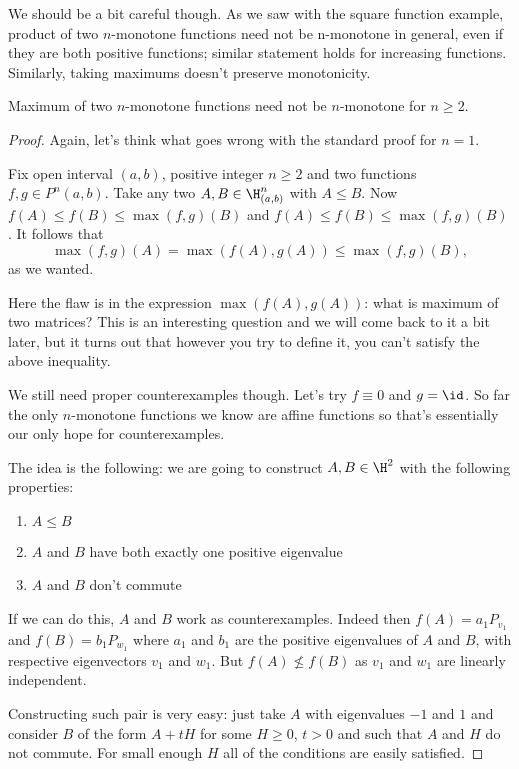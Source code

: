 We should be a bit careful though. As we saw with the square function example, product of two $n$-monotone functions need not be n-monotone in general, even if they are both positive functions; similar statement holds for increasing functions. Similarly, taking maximums doesn't preserve monotonicity.

\begin{prop}
	Maximum of two $n$-monotone functions need not be $n$-monotone for $n \geq 2$.
\end{prop}
\begin{proof}
	Again, let's think what goes wrong with the standard proof for $n = 1$.

	Fix open interval $(a, b)$, positive integer $n \geq 2$ and two functions $f, g \in P^{n}(a, b)$. Take any two $A, B \in \H_{(a, b)}^{n}$ with $A \leq B$. Now $f(A) \leq f(B) \leq \max(f, g)(B)$ and $f(A) \leq f(B) \leq \max(f, g)(B)$. It follows that
	\[
		\max(f, g)(A) = \max(f(A), g(A)) \leq \max(f, g)(B),
	\]
	as we wanted.

	Here the flaw is in the expression $\max(f(A), g(A))$: what is maximum of two matrices? This is an interesting question and we will come back to it a bit later, but it turns out that however you try to define it, you can't satisfy the above inequality.

	We still need proper counterexamples though. Let's try $f \equiv 0$ and $g = \id$. So far the only $n$-monotone functions we know are affine functions so that's essentially our only hope for counterexamples.

	The idea is the following: we are going to construct $A, B \in \H^{2}$ with the following properties:
	\begin{enumerate}
		\item $A \leq B$
		\item $A$ and $B$ have both exactly one positive eigenvalue
		\item $A$ and $B$ don't commute
	\end{enumerate}
	If we can do this, $A$ and $B$ work as counterexamples. Indeed then $f(A) = a_{1} P_{v_{1}}$ and $f(B) = b_{1} P_{w_{1}}$ where $a_{1}$ and $b_{1}$ are the positive eigenvalues of $A$ and $B$, with respective eigenvectors $v_{1}$ and $w_{1}$. But $f(A) \not\leq f(B)$ as $v_{1}$ and $w_{1}$ are linearly independent.

	Constructing such pair is very easy: just take $A$ with eigenvalues $-1$ and $1$ and consider $B$ of the form $A + t H$ for some $H \geq 0$, $t > 0$ and such that $A$ and $H$ do not commute. For small enough $H$ all of the conditions are easily satisfied.
\end{proof}


